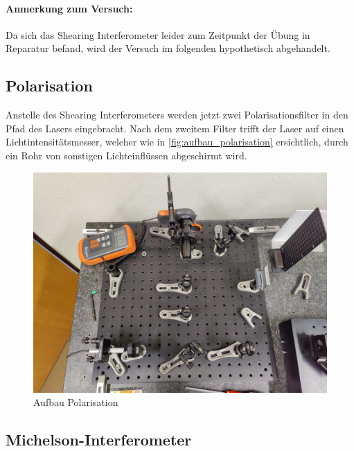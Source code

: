 \documentclass[ngerman]{scrartcl}
\begin{document}
\paragraph{Anmerkung zum Versuch:} Da sich das Shearing Interferometer leider zum Zeitpunkt der Übung in Reparatur befand, wird der Versuch im folgenden hypothetisch abgehandelt.


\subsection{Polarisation}
\label{sec:aufbau_polarisation}

Anstelle des Shearing Interferometers werden jetzt zwei Polarisationsfilter in den Pfad des Lasers eingebracht. Nach dem zweitem Filter trifft der Laser auf einen Lichtintensitätsmesser, welcher wie in \autoref{fig:aufbau_polarisation} ersichtlich, durch ein Rohr von sonstigen Lichteinflüssen abgeschirmt wird.
%
\begin{figure}[H]
    \centering
    \begin{samepage}
        \includegraphics[width=0.7\linewidth]{fig/Compressed/Aufbau_polarisation.jpg}
        \caption{Aufbau Polarisation}
        \label{fig:aufbau_polarisation}
    \end{samepage}
\end{figure}


\subsection{Michelson-Interferometer}
\label{sec:aufbau_michelson}
\end{document}
